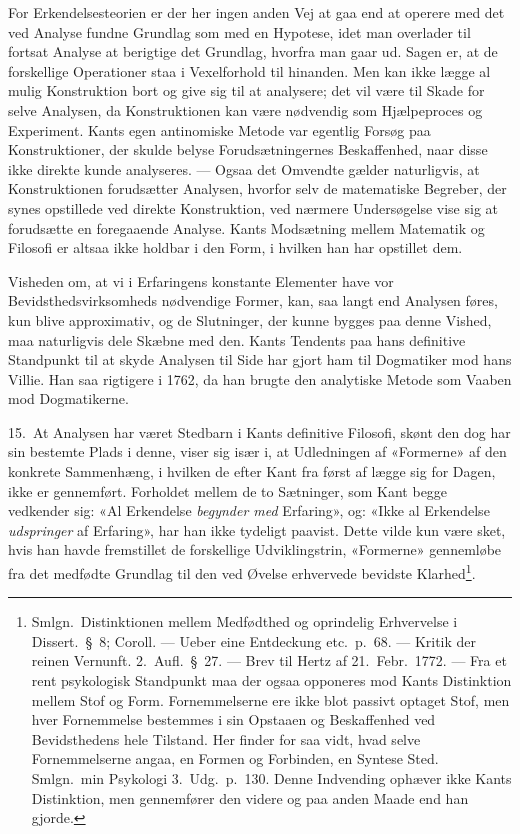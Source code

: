 \documentclass[12pt,a4paper]{article}
\newcommand{\apage}[1]{\marginnote{\footnotesize\textit{[#1]}}}
\begin{document}
For Erkendelsesteorien er der her ingen anden Vej at gaa end at operere
med det ved Analyse fundne Grundlag som med en Hypotese, idet man
overlader til fortsat Analyse at berigtige det Grundlag, hvorfra man gaar
ud. Sagen er, at de forskellige Operationer staa i Vexelforhold til
hinanden. Men kan ikke lægge al mulig Konstruktion bort og give sig til
at analysere; det vil være til Skade for selve Analysen, da
Konstruktionen kan være nødvendig som Hjælpeproces og Experiment. Kants
egen antinomiske Metode var egentlig Forsøg paa Konstruktioner, der
skulde belyse Forudsætningernes Beskaffenhed, naar disse ikke direkte
kunde analyseres. --- Ogsaa det Omvendte gælder naturligvis, at
Konstruktionen forudsætter Analysen, hvorfor selv de matematiske
Begreber, der synes opstillede ved direkte Konstruktion, ved nærmere
Undersøgelse vise sig at forudsætte en foregaaende Analyse. Kants
Modsætning mellem Matematik og Filosofi er altsaa ikke holdbar i den
Form, i hvilken han har opstillet dem.

Visheden om, at vi i Erfaringens konstante Elementer have vor
Bevidsthedsvirksomheds nødvendige Former, kan, saa langt end Analysen
føres, kun blive approximativ, og de Slutninger, der kunne bygges paa
denne Vished, maa naturligvis dele Skæbne med
den. Kants Tendents paa hans definitive Standpunkt til at
skyde Analysen til Side har gjort ham til Dogmatiker mod hans Villie. Han
saa rigtigere i 1762, da han brugte den analytiske Metode som Vaaben mod
Dogmatikerne.

15.\ At Analysen har været Stedbarn i Kants definitive Filosofi, skønt
den dog har sin bestemte Plads i denne, viser sig især i, at Udledningen
af «Formerne» af den konkrete Sammenhæng, i hvilken de efter Kant fra
først af lægge sig for Dagen, ikke er gennemført. Forholdet mellem de to
Sætninger, som Kant begge vedkender sig: «Al Erkendelse \emph{begynder med}
Erfaring», og: «Ikke al Erkendelse \emph{udspringer} af Erfaring», har han ikke
tydeligt paavist. Dette vilde kun være sket, hvis han havde fremstillet
de forskellige Udviklingstrin, «Formerne» gennemløbe fra det medfødte
Grundlag til den ved Øvelse erhvervede bevidste
Klarhed\footnote{Smlgn.\ Distinktionen mellem Medfødthed og oprindelig
Erhvervelse i Dissert.\ §\ 8; Coroll. --- Ueber eine Entdeckung
etc.\ p.\ 68. --- Kritik der reinen Vernunft. 2.\ Aufl.\ §\ 27.
--- Brev til Hertz af 21.\ Febr.\ 1772. --- Fra et rent psykologisk
Standpunkt maa der ogsaa opponeres mod Kants Distinktion mellem Stof og
Form. Fornemmelserne ere ikke blot passivt optaget Stof, men hver
Fornemmelse bestemmes i sin Opstaaen og Beskaffenhed ved Bevidsthedens
hele Tilstand. Her finder for saa vidt, hvad selve Fornemmelserne angaa,
en Formen og Forbinden, en Syntese Sted. Smlgn.\ min Psykologi 3.\ Udg.\
p.\ 130. Denne Indvending ophæver ikke Kants Distinktion, men gennemfører
den videre og paa anden Maade end han gjorde.}. \apage{31} 
\end{document}
